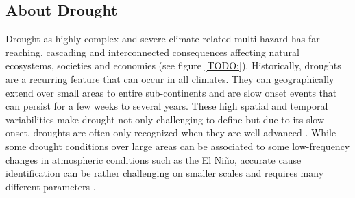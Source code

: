 

\subsection{About Drought}\label{subsec:about_drought}

Drought as highly complex and severe climate-related multi-hazard has far reaching, cascading and interconnected consequences affecting natural ecosystems, societies and economies (see figure \ref*{TODO:})\autocite{vereintenationenSpecialReportDrought2021}. Historically, droughts are a recurring feature that can occur in all climates. They can geographically extend over small areas to entire sub-continents and are slow onset events that can persist for a few weeks to several years. These high spatial and temporal variabilities make drought not only challenging to define but due to its slow onset, droughts are often only recognized when they are well advanced \autocite{idmpDroughtWaterScarcity2022,vereintenationenSpecialReportDrought2021}. While some drought conditions over large areas can be associated to some low-frequency changes in atmospheric conditions such as the El Niño, accurate cause identification can be rather challenging on smaller scales and requires many different parameters \autocite{botaiAnalysisDroughtProgression2019, vereintenationenSpecialReportDrought2021}.





